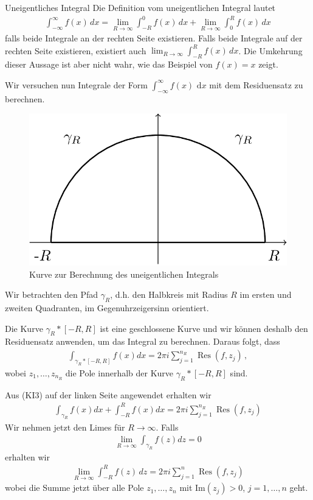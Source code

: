 \documentclass[a4paper,10pt]{article}
\def\dx{\text{ d}x}
\def\Im{\text{Im}}
\begin{document}
\begin{subbox}{Uneigentliches Integral}
  Die Definition vom uneigentlichen Integral lautet \begin{align*} \int_{-\infty}^\infty f(x)\,dx=\lim_{R\to\infty}\int_{-R}^0f(x)\,dx+\lim_{R\to\infty}\int_{0}^Rf(x)\,dx \end{align*} falls beide Integrale an der rechten Seite existieren. Falls beide Integrale auf der rechten Seite existieren, existiert auch \(\lim_{R\to\infty}\int_{-R}^Rf(x)\,dx\). Die Umkehrung dieser Aussage ist aber nicht wahr, wie das Beispiel von \(f(x)=x\) zeigt.
\end{subbox}

Wir versuchen nun Integrale der Form $\int_{-\infty}^\infty f(x) \dx$ mit dem Residuensatz zu berechnen.

\begin{figure}[H]
  \centering 
  \includegraphics[width=0.5\linewidth]{assets/4-4-1.png}
  \caption{Kurve zur Berechnung des uneigentlichen Integrals}
\end{figure}

Wir betrachten den Pfad $\gamma_R$, d.h. den Halbkreis mit Radius $R$ im ersten und zweiten Quadranten, im Gegenuhrzeigersinn orientiert.

Die Kurve \(\gamma_R\ast[-R,R]\) ist eine geschlossene Kurve und wir können deshalb den Residuensatz anwenden, um das Integral zu berechnen. Daraus folgt, dass 
\begin{align*} \int_{\gamma_R\ast[-R,R]} f(x) dx=2\pi i\sum_{j=1}^{n_R}\operatorname{Res}(f,z_j)\,, \end{align*} 
wobei \(z_1,\dots, z_{n_R}\) die Pole innerhalb der Kurve \(\gamma_R\ast[-R,R]\) sind.


Aus (KI3) auf der linken Seite angewendet erhalten wir \begin{align*} \int_{\gamma_R} f(x) dx+\int_{-R}^{R} f(x) dx=2\pi i\sum_{j=1}^{n_R}\operatorname{Res}(f,z_j) \end{align*} Wir nehmen jetzt den Limes für \(R \to \infty\). Falls \begin{align*} \lim_{R\to \infty} \int_{\gamma_R} f(z)dz = 0  \end{align*} erhalten wir \begin{align*} \lim_{R\to\infty}\int_{-R}^Rf(z)\,dz=2\pi i\sum_{j=1}^{n}\operatorname{Res}(f,z_j) \end{align*} wobei die Summe jetzt über alle Pole \(z_1,\dots, z_n\) mit \(\Im(z_j)>0\), \(j=1,\dots,n\) geht.
\end{document}
